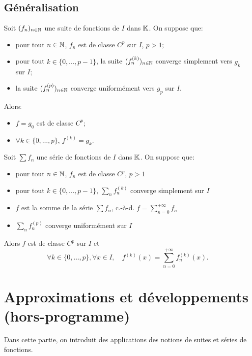 \documentclass{book}
\newcommand{\fn}{(f_n)_{n\in \N   }}
\newcommand{\Sfn}{\sum f_n}
\begin{document}
\subsection{Généralisation}\label{sec:deriv2}

\begin{Theoreme}
Soit $\fn$ une suite de fonctions de $I$ dans $\mathbb{K}  $.
On suppose que:
\begin{itemize}
\item
  pour tout $n\in \mathbb{N}   $, $f_n$ est de classe $C^p$ sur $I$, $p>1$;
\item
  pour tout $k\in \{0,\dots, p-1\}$,
  la suite $(f^{(k)}_n)_{n\in\mathbb{N}}$ converge simplement vers $g_k$ sur $I$;
\item
  la suite $(f^{(p)}_n)_{n\in\mathbb{N}}$ converge uniformément vers $g_p$ sur $I$.
  \end{itemize}
Alors:
\begin{itemize}
\item
  $f=g_0$ est de classe $C^p$;
\item
 $\forall  k\in \{0,\dots, p\}$, $f^{(k)} = g_k$.
\end{itemize}
\end{Theoreme}
\begin{Theoreme}
Soit $\Sfn$ une série de fonctions de $I$ dans $\mathbb{K}  $.
On suppose que:
\begin{itemize}
\item
  pour tout $n\in \mathbb{N}   $, $f_n$ est de classe $C^p$, $p>1$
\item
  pour tout $k\in \{0,\dots, p-1\}$, $\sum _n f_n^{(k)}$ converge simplement sur $I$
\item
  $f$ est la somme de la série $\Sfn$, c.-à-d. $f =\sum _{n=0}^{+\infty } f_n$
\item
  $\sum _n f_n^{(p)}$ converge uniformément sur $I$
\end{itemize}
Alors $f$ est de classe $C^p$ sur $I$ et
\[ \forall  k\in  \{0,\dots, p\}, \forall  x\in I,\quad f^{(k)}(x) = \sum _{n=0}^{+\infty } f^{(k)}_n(x). \]
\end{Theoreme}
%
\section{Approximations et développements (hors-programme)}
Dans cette partie, on introduit des applications des notions de suites et séries de fonctions.    
\end{document}

